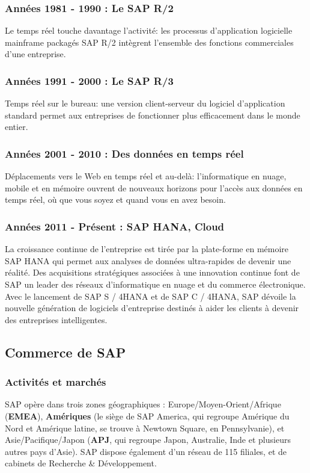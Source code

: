     \subsubsection{Années 1981 - 1990 : Le SAP R/2}
    Le temps réel touche davantage l’activité: les processus d’application logicielle mainframe packagés SAP R/2 intègrent l’ensemble des fonctions commerciales d’une entreprise.

    \subsubsection{Années 1991 - 2000 : Le SAP R/3}
    Temps réel sur le bureau: une version client-serveur du logiciel d'application standard permet aux entreprises de fonctionner plus efficacement dans le monde entier.
    \subsubsection{Années 2001 - 2010 : Des données en temps réel}
    Déplacements vers le Web en temps réel et au-delà: l'informatique en nuage, mobile et en mémoire ouvrent de nouveaux horizons pour l'accès aux données en temps réel, où que vous soyez et quand vous en avez besoin.
    
    \subsubsection{Années 2011 - Présent : SAP HANA, Cloud}
    La croissance continue de l'entreprise est tirée par la plate-forme en mémoire SAP HANA qui permet aux analyses de données ultra-rapides de devenir une réalité. Des acquisitions stratégiques associées à une innovation continue font de SAP un leader des réseaux d’informatique en nuage et du commerce électronique. Avec le lancement de SAP S / 4HANA et de SAP C / 4HANA, SAP dévoile la nouvelle génération de logiciels d'entreprise destinés à aider les clients à devenir des entreprises intelligentes.

\subsection{Commerce de SAP} 
\subsubsection{Activités et marchés}
\cite{SAP-entreprise_wikipedia}SAP opère dans trois zones géographiques : Europe/Moyen-Orient/Afrique (\textbf{EMEA}), \textbf{Amériques} (le siège de SAP America, qui regroupe Amérique du Nord et Amérique latine, se trouve à Newtown Square, en Pennsylvanie), et Asie/Pacifique/Japon (\textbf{APJ}, qui regroupe Japon, Australie, Inde et plusieurs autres pays d’Asie). SAP dispose également d’un réseau de 115 filiales, et de cabinets de Recherche \& Développement.

